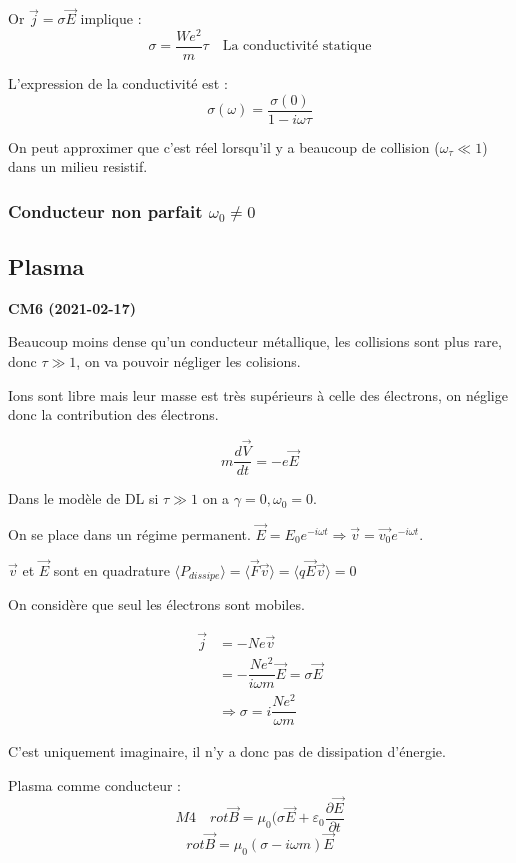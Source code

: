 \documentclass[12pt,a4paper]{report}
\begin{document}
Or \(\vec{j} = \sigma \vec{E}\) implique :
\[
	\sigma = \dfrac{We^2}{m} \tau \quad \text{La conductivité statique}
\]

L'expression de la conductivité est :
\[
	\sigma(\omega) = \dfrac{\sigma(0)}{1 - i\omega \tau}
\]

On peut approximer que c'est réel lorsqu'il y a beaucoup de collision (\(\omega_\tau \ll 1\)) dans un milieu resistif.

\subsubsection{Conducteur non parfait \(\omega_0 \neq 0\)}

\subsection{Plasma}

\begin{center}
\textbf{CM6 (2021-02-17)}
\end{center}

Beaucoup moins dense qu'un conducteur métallique, les collisions sont plus rare, donc \(\tau \gg 1\), on va pouvoir négliger les colisions.

Ions sont libre mais leur masse est très supérieurs à celle des électrons, on néglige donc la contribution des électrons.

\[
	m \dfrac{d\vec{V}}{dt} = -e \vec{E}
\]

Dans le modèle de DL si \(\tau \gg 1\) on a \(\gamma = 0, \omega_0 = 0\).

On se place dans un régime permanent. \(\vec{E} = E_0 e^{-i \omega t} \Rightarrow \vec{v} = \vec{v_0} e^{-i \omega t}\).

\(\vec{v}\) et \(\vec{E}\) sont en quadrature \(\langle P_{dissipe} \rangle = \langle \vec{F} \vec{v}\rangle = \langle q \vec{E} \vec{v}\rangle = 0\)

On considère que seul les électrons sont mobiles.

\begin{align*}
	\vec{j} &= -N e \vec{v}\\
	&= -\dfrac{N e^2}{i \omega m} \vec{E} = \sigma \vec{E}\\
	&\Rightarrow \sigma = i \dfrac{Ne^2}{\omega m}
\end{align*}

C'est uniquement imaginaire, il n'y a donc pas de dissipation d'énergie.

Plasma comme conducteur :
\[
	M4 \quad rot \vec{B} = \mu_0 (\sigma \vec{E} + \varepsilon_0 \dfrac{\partial \vec{E}}{\partial t}
\]
\[
	rot \vec{B} = \mu_0 (\sigma - i \omega m) \vec{E}
\]
\end{document}
